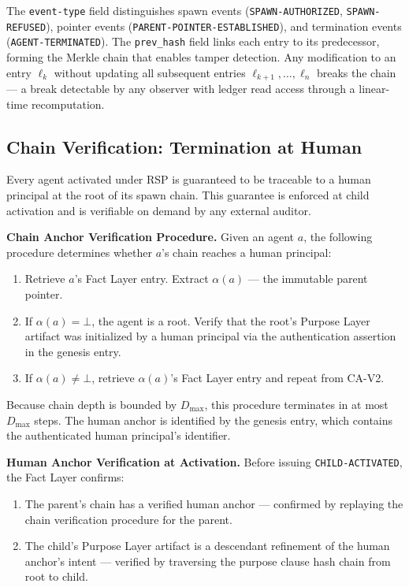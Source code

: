 The \texttt{event-type} field distinguishes spawn events (\texttt{SPAWN-AUTHORIZED}, \texttt{SPAWN-REFUSED}), pointer events (\texttt{PARENT-POINTER-ESTABLISHED}), and termination events (\texttt{AGENT-TERMINATED}). The \texttt{prev\_hash} field links each entry to its predecessor, forming the Merkle chain that enables tamper detection. Any modification to an entry $\ell_k$ without updating all subsequent entries $\ell_{k+1}, \ldots, \ell_n$ breaks the chain — a break detectable by any observer with ledger read access through a linear-time recomputation.

\subsection{Chain Verification: Termination at Human}

Every agent activated under RSP is guaranteed to be traceable to a human principal at the root of its spawn chain. This guarantee is enforced at child activation and is verifiable on demand by any external auditor.

\bigskip
\noindent\textbf{Chain Anchor Verification Procedure.} Given an agent $a$, the following procedure determines whether $a$'s chain reaches a human principal:

\begin{enumerate}
  \item[(CA-V1)] Retrieve $a$'s Fact Layer entry. Extract $\alpha(a)$ — the immutable parent pointer.

  \item[(CA-V2)] If $\alpha(a) = \bot$, the agent is a root. Verify that the root's Purpose Layer artifact was initialized by a human principal via the authentication assertion in the genesis entry.

  \item[(CA-V3)] If $\alpha(a) \neq \bot$, retrieve $\alpha(a)$'s Fact Layer entry and repeat from CA-V2.
\end{enumerate}

Because chain depth is bounded by $D_{\max}$, this procedure terminates in at most $D_{\max}$ steps. The human anchor is identified by the genesis entry, which contains the authenticated human principal's identifier.

\bigskip
\noindent\textbf{Human Anchor Verification at Activation.} Before issuing \texttt{CHILD-ACTIVATED}, the Fact Layer confirms:

\begin{enumerate}
  \item[(HAV-1)] The parent's chain has a verified human anchor — confirmed by replaying the chain verification procedure for the parent.

  \item[(HAV-2)] The child's Purpose Layer artifact is a descendant refinement of the human anchor's intent — verified by traversing the purpose clause hash chain from root to child.
\end{enumerate}

